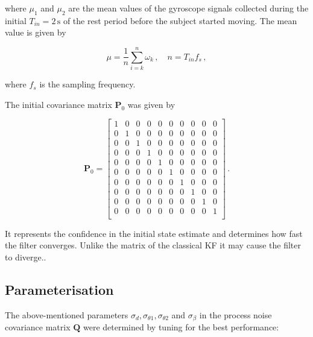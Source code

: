 \noindent
where $\mu_1$ and $\mu_2$ are the mean values of the gyroscope signals collected during the initial $T_{in}=2\,\mbox{s}$ of the rest period before the subject started moving. The mean value is given by

\begin{equation}
  \mu = \frac{1}{n} \sum_{i=k}^{n}{\omega_k}\,, \quad n = T_{in} f_s\,,
\end{equation}

\noindent
where $f_s$ is the sampling frequency.

The initial covariance matrix $\mathbf{P}_{0}$ was given by

\begin{equation}
\mathbf{P}_0 = \begin{bmatrix}
  1 & 0 & 0 & 0 & 0 & 0 & 0 & 0 & 0 & 0\\
  0 & 1 & 0 & 0 & 0 & 0 & 0 & 0 & 0 & 0\\
  0 & 0 & 1 & 0 & 0 & 0 & 0 & 0 & 0 & 0\\
  0 & 0 & 0 & 1 & 0 & 0 & 0 & 0 & 0 & 0\\
  0 & 0 & 0 & 0 & 1 & 0 & 0 & 0 & 0 & 0\\
  0 & 0 & 0 & 0 & 0 & 1 & 0 & 0 & 0 & 0\\
  0 & 0 & 0 & 0 & 0 & 0 & 1 & 0 & 0 & 0\\
  0 & 0 & 0 & 0 & 0 & 0 & 0 & 1 & 0 & 0\\
  0 & 0 & 0 & 0 & 0 & 0 & 0 & 0 & 1 & 0\\
  0 & 0 & 0 & 0 & 0 & 0 & 0 & 0 & 0 & 1\\
\end{bmatrix}\,.
\end{equation}

\noindent
It represents the confidence in the initial state estimate and determines how fast the filter converges. Unlike the matrix of the classical KF it may cause the filter to diverge..

\subsection{Parameterisation}

The above-mentioned parameters $\sigma_d, \sigma_{\theta 1}, \sigma_{\theta 2}$ and $\sigma_{\beta}$ in the process noise covariance matrix $\mathbf{Q}$ were determined by tuning for the best performance:

